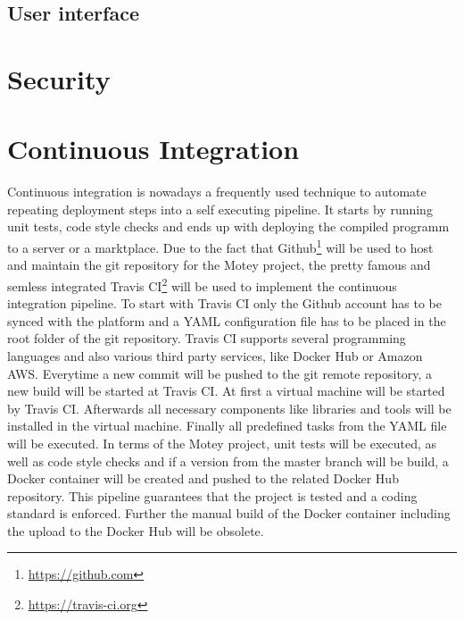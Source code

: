 
\subsection{User interface}
\doit

\section{Security}
\doit

\section{Continuous Integration}
Continuous integration is nowadays a frequently used technique to automate repeating deployment steps into a self executing pipeline.
It starts by running unit tests, code style checks and ends up with deploying the compiled programm to a server or a marktplace.
Due to the fact that Github\footnote{\url{https://github.com}} will be used to host and maintain the git repository for the Motey project, the pretty famous and semless integrated Travis CI\footnote{\url{https://travis-ci.org}} will be used to implement the continuous integration pipeline.
To start with Travis CI only the Github account has to be synced with the platform and a \ac{YAML} configuration file has to be placed in the root folder of the git repository.
Travis CI supports several programming languages and also various third party services, like Docker Hub or Amazon AWS.
Everytime a new commit will be pushed to the git remote repository, a new build will be started at Travis CI.
At first a virtual machine will be started by Travis CI.
Afterwards all necessary components like libraries and tools will be installed in the virtual machine.
Finally all predefined tasks from the \ac{YAML} file will be executed.
In terms of the Motey project, unit tests will be executed, as well as code style checks and if a version from the master branch will be build, a Docker container will be created and pushed to the related Docker Hub repository.
This pipeline guarantees that the project is tested and a coding standard is enforced.
Further the manual build of the Docker container including the upload to the Docker Hub will be obsolete.
